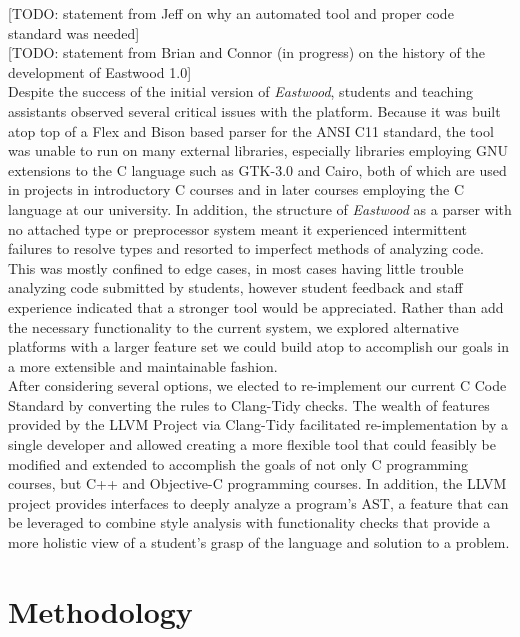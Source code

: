 \documentclass[sigconf]{acmart}
\begin{document}
[TODO: statement from Jeff on why an automated tool and proper code standard was needed]
\\

[TODO: statement from Brian and Connor (in progress) on the history of the development of Eastwood 1.0]
\\

Despite the success of the initial version of \textit{Eastwood}, students and teaching
assistants observed several critical issues with the platform. Because it was built atop
top of a Flex and Bison based parser for the ANSI C11 standard, the tool was unable to
run on many external libraries, especially libraries employing GNU extensions to the C
language such as GTK-3.0 and Cairo, both of which are used in projects in introductory C
courses and in later courses employing the C language at our university. In addition,
the structure of \textit{Eastwood} as a parser with no attached type or preprocessor
system meant it experienced intermittent failures to resolve types and resorted to
imperfect methods of analyzing code. This was mostly confined to edge cases, in most
cases having little trouble analyzing code submitted by students, however student
feedback and staff experience indicated that a stronger tool would be appreciated.
Rather than add the necessary functionality to the current system, we explored
alternative platforms with a larger feature set we could build atop to accomplish our
goals in a more extensible and maintainable fashion.
\\

After considering several options, we elected to re-implement our current C Code
Standard by converting the rules to Clang-Tidy \cite{ClangTidyChecks} checks.
The wealth of features provided by the LLVM Project via Clang-Tidy facilitated
re-implementation by a single developer and allowed creating a more flexible tool that
could feasibly be modified and extended to accomplish the goals of not only C
programming courses, but C++ and Objective-C programming courses. In addition, the LLVM
project provides interfaces to deeply analyze a program's AST, a feature that can be
leveraged to combine style analysis with functionality checks that provide a more
holistic view of a student's grasp of the language and solution to a problem.
\\

\section{Methodology}
\end{document}

